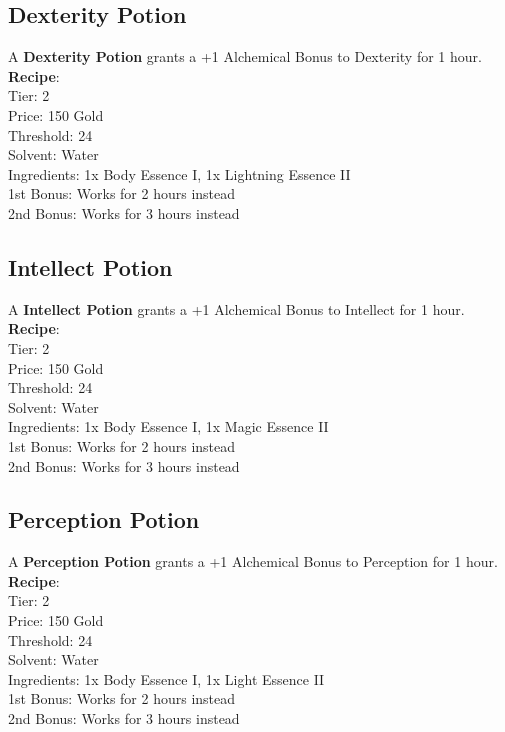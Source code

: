 \subsection{Dexterity Potion}\label{potion:dexterityPotion}
A \textbf{Dexterity Potion} grants a +1 Alchemical Bonus to Dexterity for 1 hour.\\
\textbf{Recipe}:\\
Tier: 2\\
Price: 150 Gold\\
Threshold: 24\\
Solvent: Water\\
Ingredients: 1x Body Essence I, 1x Lightning Essence II\\
1st Bonus: Works for 2 hours instead\\
2nd Bonus: Works for 3 hours instead\\

\subsection{Intellect Potion}\label{potion:intellectPotion}
A \textbf{Intellect Potion} grants a +1 Alchemical Bonus to Intellect for 1 hour.\\
\textbf{Recipe}:\\
Tier: 2\\
Price: 150 Gold\\
Threshold: 24\\
Solvent: Water\\
Ingredients: 1x Body Essence I, 1x Magic Essence II\\
1st Bonus: Works for 2 hours instead\\
2nd Bonus: Works for 3 hours instead\\

\subsection{Perception Potion}\label{potion:perceptionPotion}
A \textbf{Perception Potion} grants a +1 Alchemical Bonus to Perception for 1 hour.\\
\textbf{Recipe}:\\
Tier: 2\\
Price: 150 Gold\\
Threshold: 24\\
Solvent: Water\\
Ingredients: 1x Body Essence I, 1x Light Essence II\\
1st Bonus: Works for 2 hours instead\\
2nd Bonus: Works for 3 hours instead\\

